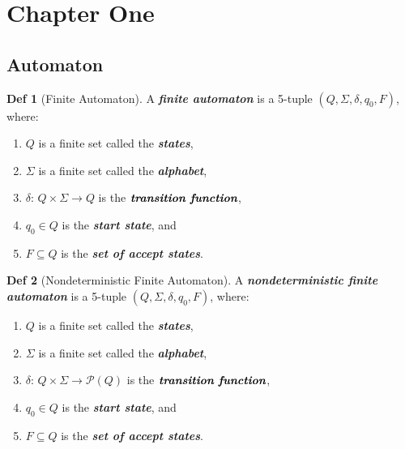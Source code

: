 \documentclass[12pt]{article}
\author{Justen Rickert}
\date{\today}
\title{}
\begin{document}
\newcommand\abs[1]{\left|#1\right|}
\newcommand\deg{\textdegree}
\newcommand\Real{\mathbb{R}}
\newcommand\Natural{\mathbb{N}}
\newcommand\sube{\subseteq}
\newcommand\supe{\supseteq}
\newcommand\sub{\subset}
\newcommand\sup{\supset}
\newcommand\setm{\setminus}
\newcommand\pr{\ensuremath{'}}
\newcommand\R{\mathcal{R}}
\newcommand\calR{\mathcal{R}}
\newcommand\calP{\mathcal{P}}
\newcommand\pow{\mathscr{P}}
\newcommand\indX{\mathscr{X}}
\newcommand\nil{\varnothing}

\newtheorem{lemma}[Theorem]{lemma}
\theoremstyle{definition}
\newtheorem{definition}{Def}[section]

\section{Chapter One}
\label{sec:org39ce2ba}
\subsection{Automaton}
\label{sec:org9cc5937}
\begin{definition}[Finite Automaton]
  A \textit{\textbf{finite automaton}} is a 5-tuple $(Q,\Sigma,\delta,q_0,F)$,
  where:
  \begin{enumerate}
  \item $Q$ is a finite set called the \textit{\textbf{states}},
  \item $\Sigma$ is a finite set called the \textit{\textbf{alphabet}},
  \item $\delta$: $Q\times\Sigma\longrightarrow Q$ is the
    $\textit{\textbf{transition function}}$,
  \item $q_0\in Q$ is the \textit{\textbf{start state}}, and
  \item $F\subseteq Q$ is the \textit{\textbf{set of accept states}}.
  \end{enumerate}
\end{definition}

\begin{definition}[Nondeterministic Finite Automaton]
  A \textit{\textbf{nondeterministic finite automaton}} is a 5-tuple
  $(Q,\Sigma,\delta,q_0,F)$, where:
  \begin{enumerate}
  \item $Q$ is a finite set called the \textit{\textbf{states}},
  \item $\Sigma$ is a finite set called the \textit{\textbf{alphabet}},
  \item $\delta$: $Q\times\Sigma\longrightarrow \pow(Q)$ is the
    $\textit{\textbf{transition function}}$,
  \item $q_0\in Q$ is the \textit{\textbf{start state}}, and
  \item $F\subseteq Q$ is the \textit{\textbf{set of accept states}}.
  \end{enumerate}
\end{definition}
\end{document}
